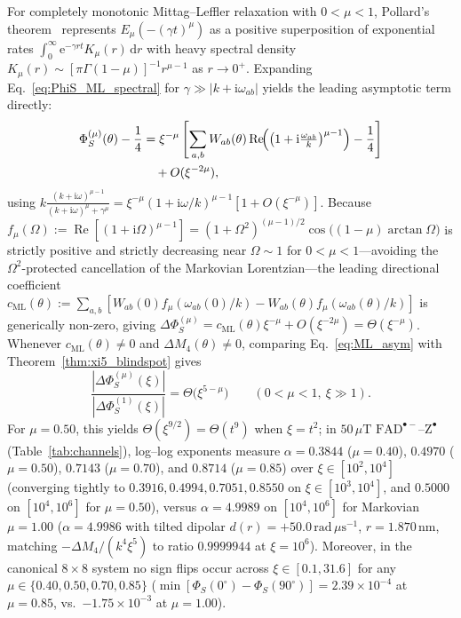 \documentclass[twocolumn,10pt,amsmath,amssymb,floatfix]{revtex4-2}
\theoremstyle{plain}
\theoremstyle{definition}
\newcommand{\dd}{\mathrm{d}}
\newcommand{\ii}{\mathrm{i}}
\newcommand{\ee}{\mathrm{e}}
\newcommand{\DeltaPhi}{\Delta\Phi_S}
\begin{document}
For completely monotonic Mittag--Leffler relaxation with $0 < \mu < 1$, Pollard's theorem~\cite{Pollard1948BAMS,Gorenflo2002FCAA} represents $E_\mu(-(\gamma t)^\mu)$ as a positive superposition of exponential rates $\int_0^\infty \ee^{-\gamma r t} K_\mu(r)\,\dd r$ with heavy spectral density $K_\mu(r) \sim [\pi\Gamma(1-\mu)]^{-1} r^{\mu-1}$ as $r \to 0^+$. Expanding Eq.~\eqref{eq:PhiS_ML_spectral} for $\gamma \gg |k+\ii\omega_{ab}|$ yields the leading asymptotic term directly:
\begin{align}
\label{eq:ML_asym}
\Phi_S^{(\mu)}(\theta) - \frac{1}{4} &= \xi^{-\mu}\,\Biggl[\sum_{a,b} W_{ab}(\theta) \operatorname{Re}\!\Bigl(\bigl(1 + \ii\tfrac{\omega_{ab}}{k}\bigr)^{\mu-1}\Bigr) - \frac{1}{4}\Biggr] \nonumber\\
&\quad + O(\xi^{-2\mu}),
\end{align}
using $k\frac{(k+\ii\omega)^{\mu-1}}{(k+\ii\omega)^\mu + \gamma^\mu} = \xi^{-\mu}(1+\ii\omega/k)^{\mu-1}[1 + O(\xi^{-\mu})]$. Because $f_{\mu}(\Omega) := \operatorname{Re}[(1+\ii\Omega)^{\mu-1}] = (1+\Omega^2)^{(\mu-1)/2}\cos\bigl((1-\mu)\arctan\Omega\bigr)$ is strictly positive and strictly decreasing near $\Omega \sim 1$ for $0<\mu<1$---avoiding the $\Omega^2$-protected cancellation of the Markovian Lorentzian---the leading directional coefficient $c_{\mathrm{ML}}(\theta) := \sum_{a,b} [W_{ab}(0) f_\mu(\omega_{ab}(0)/k) - W_{ab}(\theta) f_\mu(\omega_{ab}(\theta)/k)]$ is generically non-zero, giving $\DeltaPhi^{(\mu)} = c_{\mathrm{ML}}(\theta)\xi^{-\mu} + O(\xi^{-2\mu}) = \Theta(\xi^{-\mu})$. Whenever $c_{\mathrm{ML}}(\theta) \neq 0$ and $\Delta M_4(\theta) \neq 0$, comparing Eq.~\eqref{eq:ML_asym} with Theorem~\ref{thm:xi5_blindspot} gives
\begin{equation}
\label{eq:xi5minusmu}
\frac{|\DeltaPhi^{(\mu)}(\xi)|}{|\DeltaPhi^{(1)}(\xi)|} = \Theta\bigl(\xi^{5-\mu}\bigr) \qquad (0 < \mu < 1,\ \xi \gg 1).
\end{equation}
For $\mu = 0.50$, this yields $\Theta(\xi^{9/2}) = \Theta(t^9)$ when $\xi = t^2$; in $50\,\mu\text{T}$ $\mathrm{FAD}^{\bullet-}\text{--}\mathrm{Z}^{\bullet}$ (Table~\ref{tab:channels}), log--log exponents measure $\alpha = 0.3844$ ($\mu=0.40$), $0.4970$ ($\mu=0.50$), $0.7143$ ($\mu=0.70$), and $0.8714$ ($\mu=0.85$) over $\xi \in [10^2, 10^4]$ (converging tightly to $0.3916, 0.4994, 0.7051, 0.8550$ on $\xi \in [10^3, 10^4]$, and $0.5000$ on $[10^4, 10^6]$ for $\mu=0.50$), versus $\alpha = 4.9989$ on $[10^4, 10^6]$ for Markovian $\mu=1.00$ ($\alpha = 4.9986$ with tilted dipolar $d(r) = +50.0\,\text{rad}\,\mu\text{s}^{-1}$, $r=1.870\,\text{nm}$, matching $-\Delta M_4/(k^4\xi^5)$ to ratio $0.9999944$ at $\xi=10^6$). Moreover, in the canonical $8\times 8$ system no sign flips occur across $\xi \in [0.1, 31.6]$ for any $\mu \in \{0.40,0.50,0.70,0.85\}$ ($\min[\Phi_S(0^\circ)-\Phi_S(90^\circ)] = 2.39\times 10^{-4}$ at $\mu=0.85$, vs.\ $-1.75\times 10^{-3}$ at $\mu=1.00$).
\end{document}
